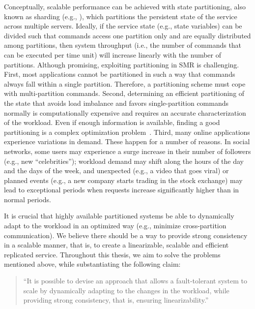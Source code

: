 Conceptually, scalable performance can be achieved with state partitioning, also
known as sharding (e.g., \cite{facebookTAO, sciascia2012sdur, aguilera2007sinfonia}),
which partitions the persistent state of the service across multiple servers.
Ideally, if the service state (e.g., state variables) can be divided
such that commands access one partition only and are equally distributed among
partitions, then system throughput (i.e., the number of commands that can be
executed per time unit) will increase linearly with the number of partitions.
Although promising, exploiting partitioning in SMR is challenging. First, most
applications cannot be partitioned in such a way that commands always fall
within a single partition. Therefore, a partitioning scheme must cope with
multi-partition commands. Second, determining an efficient partitioning of the
state that avoids load imbalance and favors single-partition commands normally
is computationally expensive and requires an accurate characterization of the
workload. Even if enough information is available, finding a good partitioning
is a complex optimization problem~\cite{curino2010sch,taft2014est}. Third, many
online applications experience variations in demand. These happen for a number
of reasons. In social networks, some users may experience a surge increase in
their number of followers (e.g., new ``celebrities''); workload demand may shift
along the hours of the day and the days of the week, and unexpected (e.g., a
video that goes viral) or planned events (e.g., a new company starts trading in
the stock exchange) may lead to exceptional periods when requests increase
significantly higher than in normal periods. %

It is crucial that highly available partitioned systems be able to dynamically
adapt to the workload in an optimized way (e.g., minimize cross-partition
communication). We believe there should be a way to provide strong consistency
in a scalable manner, that is, to create a linearizable, scalable and efficient
replicated service. Throughout this thesis, we aim to solve the problems
mentioned above, while substantiating the following claim:

\begin{quote}
``It is possible to devise an approach that allows a fault-tolerant system to
scale by dynamically adapting to the changes in the workload, while providing
strong consistency, that is, ensuring linearizability.''
\end{quote}


